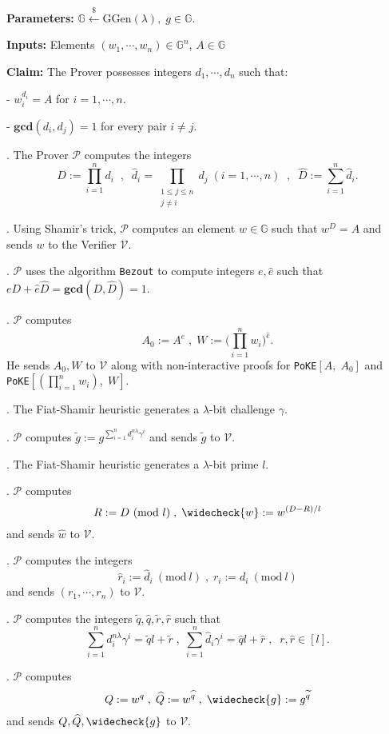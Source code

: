 \documentclass[11pt, lettersize, notitlepage, leqno, footskip=0.6cm]{article}
\newcommand{\pl}{\prod\limits}
\newcommand{\slim}{\sum\limits}
\newcommand{\wti}{\widetilde}
\newcommand{\mc}{\mathcal}
\newcommand{\mb}{\mathbb}
\newcommand{\mbf}{\mathbf}
\newcommand{\mr}{\mathrm}
\newcommand{\lam}{\lambda}
\newcommand{\lamb}{\lambda}
\newcommand{\what}{\widehat}
\newcommand{\weck}{\widecheck}
\newcommand{\mP}{\mc{P}}
\newcommand{\V}{\mc{V}}
\newcommand{\vs}{\vspace{-0.15cm}}
\newcommand{\noin}{\noindent}
\newcommand{\Mod}[1]{\ (\mathrm{mod}\ #1)}
\newcommand{\GCD}{\mbf{gcd}}
\numberwithin{equation}{section}
\begin{document}
\noindent \textbf{Parameters:} $\mb{G}\xleftarrow{\$} \mr{GGen}(\lamb), \; g\in \mb{G}$.

\noindent \textbf{Inputs:} Elements $(w_1,\cdots, w_n)\in \mb{G}^n$, $A\in\mb{G}$

\noindent \textbf{Claim:} The Prover possesses integers $ d_1,\cdots, d_n$ such that:

\noindent - $w_i^{d_i} = A$ for $i = 1,\cdots,n$.

\noindent - $\GCD(d_i, d_j) = 1$ for every pair $i\neq j$.

\begin{prf1} . The Prover $\mc{P}$ computes the integers \vs $$D := \prod\limits_{i=1}^n d_i\;\;,\;\;\what{d}_i = \pl_{\substack{1\leq j\leq n\\ j\neq i}} d_j\;(i=1,\cdots,n)\;\;,\;\; \what{D}:=\slim_{i=1}^n\what{d}_i.$$ 

\noin 2. Using Shamir's trick, $\mc{P}$ computes an element $w\in\mb{G}$ such that $w^D = A$ and sends $w$ to the Verifier $\mc{V}$.

\noin 3. $\mP$ uses the algorithm \verb|Bezout| to compute integers $e,\what{e}$ such that $eD+\what{e}\what{D} = \GCD(D,\what{D}) = 1.$

\noin 4. $\mP$ computes $$A_0:= A^{e}\;,\;W := \big(\pl_{i=1}^n w_i\big)^{\what{e}}.$$ He sends $A_0,W$ to $\V$ along with non-interactive proofs for \verb|PoKE|$[A,\; A_0]$ and \verb|PoKE|$[(\pl_{i=1}^n w_i),\; W]$.

\noin 5. The Fiat-Shamir heuristic generates a $\lam$-bit challenge $\gamma$.

\noin 6. $\mc{P}$ computes $\wti{g}:= g^{\slim_{i=1}^n d_i^{n\lam}\gamma^i}$ and sends $\wti{g}$ to $\mc{V}$.

\noin 7. The Fiat-Shamir heuristic generates a $\lam$-bit prime $l$.

\noin 8. $\mc{P}$ computes \vs $$R:= D\Mod{l}\;,\; \weck{w}:= w^{(D-R)/l}$$ and sends $\what{w}$ to $\mc{V}$.

\noin 9. $\mc{P}$ computes the integers \vs $$\what{r}_i:= \what{d}_i\Mod{l}\;,\;{r}_i:= {d}_i\Mod{l}$$ and sends $(r_1,\cdots,r_n)$ to $\mc{V}$.

\noin 10. $\mP$ computes the integers $\wti{q},\what{q}, \wti{r}, \what{r}$ such that \vs $$\slim_{i=1}^n {d}_i^{n\lam}\gamma^i = \wti{q}l+\wti{r}\;,\; \slim_{i=1}^n \what{d}_i\gamma^i = \what{q}l+\what{r}\;,\;\;r,\what{r}\in [l].$$

\noin 11. $\mP$ computes \vs $$Q:= w^q\;,\; \what{Q}:= w^{\what{q}}\;,\;\weck{g}:= g^{\wti{q}}$$ and sends $Q, \what{Q}, \weck{g}$ to $\V$.


\end{prf1}
\end{document}
